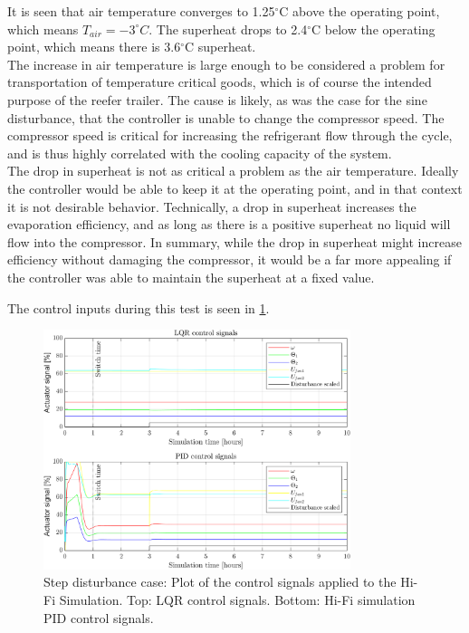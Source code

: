 \noindent It is seen that air temperature converges to 1.25$^{\circ}$C above the operating point, which means $T_{air} = -3^{\circ}C$. The superheat drops to 2.4$^{\circ}$C below the operating point, which means there is 3.6$^{\circ}$C superheat.\\

The increase in air temperature is large enough to be considered a problem for transportation of temperature critical goods, which is of course the intended purpose of the reefer trailer. The cause is likely, as was the case for the sine disturbance, that the controller is unable to change the compressor speed. The compressor speed is critical for increasing the refrigerant flow through the cycle, and is thus highly correlated with the cooling capacity of the system. \\

The drop in superheat is not as critical a problem as the air temperature. Ideally the controller would be able to keep it at the operating point, and in that context it is not desirable behavior. Technically, a drop in superheat increases the evaporation efficiency, and as long as there is a positive superheat no liquid will flow into the compressor. In summary, while the drop in superheat might increase efficiency without damaging the compressor, it would be a far more appealing if the controller was able to maintain the superheat at a fixed value.

The control inputs during this test is seen in \cref{fig:inputs_stepDist}.

\begin{figure}[H]
	\centering
	\includegraphics[width=0.8\textwidth]{Graphics/fig_inputs_stepDist.png}
	\caption{Step disturbance case: Plot of the control signals applied to the Hi-Fi Simulation. Top: LQR control signals. Bottom: Hi-Fi simulation PID control signals.}
	\label{fig:inputs_stepDist}
\end{figure}

